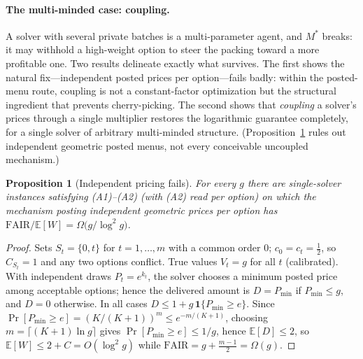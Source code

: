 \documentclass[11pt]{article}
\newtheorem{proposition}{Proposition}
\theoremstyle{remark}
\newcommand{\FAIR}{\mathrm{FAIR}}
\newcommand{\E}{\mathbb{E}}
\begin{document}
\paragraph{The multi-minded case: coupling.}
A solver with several private batches is a multi-parameter agent, and
$M^\ast$ breaks: it may withhold a high-weight option to steer the packing
toward a more profitable one. Two results delineate exactly what survives.
The first shows the natural fix---independent posted prices per
option---fails badly: within the posted-menu route, coupling is not a
constant-factor optimization but the structural ingredient that prevents
cherry-picking. The second shows that \emph{coupling} a solver's
prices through a single multiplier restores the logarithmic guarantee
completely, for a single solver of arbitrary multi-minded structure.
(Proposition~\ref{prop:indep} rules out independent geometric posted
menus, not every conceivable uncoupled mechanism.)

\begin{proposition}[Independent pricing fails]\label{prop:indep}
For every $g$ there are single-solver instances satisfying (A1)--(A2)
(with (A2) read per option) on which the mechanism posting independent
geometric prices per option has
$\FAIR/\E[W]=\Omega\big(g/\log^2 g\big)$.
\end{proposition}

\begin{proof}
Sets $S_t=\{0,t\}$ for $t=1,\dots,m$ with a common order $0$;
$c_0=c_t=\tfrac12$, so $C_{S_t}=1$ and any two options conflict. True
values $V_t=g$ for all $t$ (calibrated). With independent draws
$P_t=e^{k_t}$, the solver chooses a minimum posted price among acceptable
options; hence the delivered amount is $D=P_{\min}$ if $P_{\min}\le g$,
and $D=0$ otherwise. In all cases $D\le 1+g\,\mathbf 1\{P_{\min}\ge e\}$.
Since $\Pr[P_{\min}\ge e]=(K/(K+1))^m\le e^{-m/(K+1)}$, choosing
$m=\lceil(K+1)\ln g\rceil$ gives $\Pr[P_{\min}\ge e]\le1/g$, hence
$\E[D]\le 2$, so
$\E[W]\le 2+C=O(\log^2 g)$ while $\FAIR=g+\tfrac{m-1}{2}=\Omega(g)$.
\end{proof}
\end{document}
